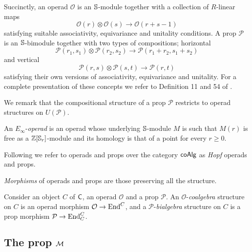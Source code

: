 Succinctly, an operad $\mathcal O$ is an $\S$-module together with a collection of $R$-linear maps
\begin{equation*}
\mathcal O(r) \otimes \mathcal O(s) \to \mathcal O(r+s-1)
\end{equation*}
satisfying suitable associativity, equivariance and unitality conditions.
A prop $\mathcal P$ is an $\S$-bimodule together with two types of compositions; horizontal
\begin{equation*}
\mathcal P(r_1, s_1) \otimes \mathcal P(r_2, s_2) \to \mathcal P(r_1 + r_2, s_1 + s_2)
\end{equation*}
and vertical
\begin{equation*}
\mathcal P(r,s) \otimes \mathcal P(s, t) \to \mathcal P(r, t)
\end{equation*}
satisfying their own versions of associativity, equivariance and unitality.
For a complete presentation of these concepts we refer to Definition 11 and 54 of \cite{Markl08}.

We remark that the compositional structure of a prop $\mathcal P$ restricts to operad structures on $U(\mathcal P)$.

An $E_\infty$-\textit{operad} is an operad whose underlying $\S$-module $M$ is such that $M(r)$ is free as a $\Z[\S_r]$-module and its homology is that of a point for every $r \geq 0$.

Following \cite{Getzler1994operads, Moerdijk1999monads} we refer to operads and props over the category $\coAlg$ as \textit{Hopf} operads and props.

\textit{Morphisms} of operads and props are those preserving all the structure.

Consider an object $C$ of $\C$, an operad $\mathcal O$ and a prop $\mathcal P$.
An $\mathcal O$-\textit{coalgebra} structure on $C$ is an operad morphism $\mathcal O \to \End^C$, and a $\mathcal P$-\textit{bialgebra} structure on $C$ is a prop morphism $\mathcal P \to \End_C^C$.

\subsection{The prop $\M$}

